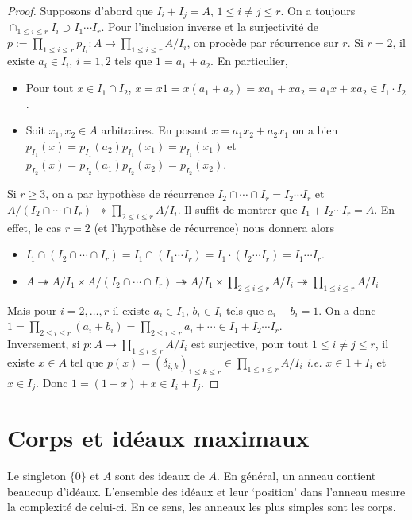 \documentclass[a4paper, oneside, 12pt]{book}
\theoremstyle{definition} %
\newcommand{\ie}{\textit{i.e.}} %
\begin{document}
   \begin{proof} Supposons d'abord que $I_i+I_j=A$, $1\leq i\not=j\leq r$.  On a toujours $\cap_{1\leq i\leq r}I_i\supset I_1\cdots I_r$. Pour l'inclusion inverse et la surjectivité de  $p:=\prod_{1\leq i\leq r}p_{I_i}:A\rightarrow \prod_{1\leq i\leq r}A/I_i$, on procède par récurrence sur $r$. Si $r=2$, il existe $a_i\in I_i$, $i=1,2$ tels que $1=a_1+ a_2$. En particulier, 
   \begin{itemize}[leftmargin=* ,parsep=0cm,itemsep=0cm,topsep=0cm]
   \item  Pour tout $x\in I_1\cap I_2$, $x=x 1=x  (a_1+ a_2)=xa_1+xa_2=a_1x+xa_2\in I_1\cdot I_2$.
   \item Soit $x_1,x_2\in A$ arbitraires. En posant $x=a_1x_2+a_2x_1$ on a bien $p_{I_1}(x)=p_{I_1}(a_2)p_{I_1}(x_1)= p_{I_1}(x_1)$ et $p_{I_2}(x)=p_{I_2}(a_1)p_{I_2}(x_2)= p_{I_2}(x_2)$.
   \end{itemize}
  Si $r\geq 3$,  on a par hypothèse de récurrence $I_2\cap\cdots \cap I_{r }=I_2\cdots I_{r}$ et   $A/(I_2\cap \cdots\cap I_r)\twoheadrightarrow \prod_{2\leq i\leq r}A/I_i$. Il suffit de montrer que $I_1+I_2\cdots I_r=A$. En effet, le cas $r=2$ (et l'hypothèse de récurrence) nous donnera alors
     \begin{itemize}
   \item  $I_1\cap (I_2\cap\cdots \cap I_{r })=I_1\cap (I_1\cdots I_r)=I_1\cdot (I_2\cdots I_r)= I_1\cdots I_r$.
   \item $A\twoheadrightarrow A/I_1\times A/(I_2\cap\cdots\cap  I_r)\twoheadrightarrow A/I_1\times\prod_{2\leq i\leq r}A/I_i\twoheadrightarrow  \prod_{1\leq i\leq r}A/I_i$
   \end{itemize}
    Mais pour $i=2,\dots, r$ il existe $a_i\in I_1$, $b_i\in I_i$ tels que $a_i+b_i=1$. On a donc $1=\prod_{2\leq i\leq r}(a_i+b_i)=\prod_{2\leq i\leq r}a_i+\cdots\in I_1+I_2\cdots I_r$.\\
     Inversement, si $p :A\rightarrow \prod_{1\leq i\leq r}A/I_i$ est surjective, pour tout $1\leq i\not=j\leq r$, il existe $x\in A$ tel que $p(x)=(\delta_{i,k})_{1\leq k\leq r}\in \prod_{1\leq i\leq r}A/I_i$ \ie{} $x\in 1+I_i$ et $x\in I_j$. Donc $1=(1-x)+x\in I_i+I_j$. \end{proof}
  


\section{Corps et idéaux maximaux} \label{Corps}Le singleton $\lbrace 0\rbrace$ et $A$ sont des ideaux de $A$. En général, un anneau contient beaucoup d'idéaux. L'ensemble des idéaux et leur `position' dans l'anneau mesure la complexité de celui-ci.  En ce sens, les anneaux les plus simples sont les corps. \\
\end{document}
